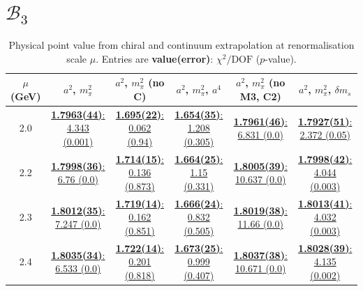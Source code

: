 \documentclass[12pt]{extarticle}
\begin{document}
\section{$\mathcal{B}_3$}
\begin{table}[h!]
\begin{center}
\begin{tabular}{|c|c|c|c|c|c|}
\hline
$\mu$ (GeV) & $a^2$, $m_\pi^2$& $a^2$, $m_\pi^2$ (no C)& $a^2$, $m_\pi^2$, $a^4$& $a^2$, $m_\pi^2$ (no M3, C2)& $a^2$, $m_\pi^2$, $\delta m_s$\\
\hline
2.0& \hyperlink{SSmPP/NPR/bag_a2m2_20.pdf.1}{\textbf{1.7963(44)}: 4.343 (0.001)} & \hyperlink{SSmPP/NPR/bag_a2m2noC_20.pdf.1}{\textbf{1.695(22)}: 0.062 (0.94)} & \hyperlink{SSmPP/NPR/bag_a2a4m2_20.pdf.1}{\textbf{1.654(35)}: 1.208 (0.305)} & \hyperlink{SSmPP/NPR/bag_a2m2mcut_20.pdf.1}{\textbf{1.7961(46)}: 6.831 (0.0)} & \hyperlink{SSmPP/NPR/bag_a2m2delm_20.pdf.1}{\textbf{1.7927(51)}: 2.372 (0.05)}\\
2.2& \hyperlink{SSmPP/NPR/bag_a2m2_22.pdf.1}{\textbf{1.7998(36)}: 6.76 (0.0)} & \hyperlink{SSmPP/NPR/bag_a2m2noC_22.pdf.1}{\textbf{1.714(15)}: 0.136 (0.873)} & \hyperlink{SSmPP/NPR/bag_a2a4m2_22.pdf.1}{\textbf{1.664(25)}: 1.15 (0.331)} & \hyperlink{SSmPP/NPR/bag_a2m2mcut_22.pdf.1}{\textbf{1.8005(39)}: 10.637 (0.0)} & \hyperlink{SSmPP/NPR/bag_a2m2delm_22.pdf.1}{\textbf{1.7998(42)}: 4.044 (0.003)}\\
2.3& \hyperlink{SSmPP/NPR/bag_a2m2_23.pdf.1}{\textbf{1.8012(35)}: 7.247 (0.0)} & \hyperlink{SSmPP/NPR/bag_a2m2noC_23.pdf.1}{\textbf{1.719(14)}: 0.162 (0.851)} & \hyperlink{SSmPP/NPR/bag_a2a4m2_23.pdf.1}{\textbf{1.666(24)}: 0.832 (0.505)} & \hyperlink{SSmPP/NPR/bag_a2m2mcut_23.pdf.1}{\textbf{1.8019(38)}: 11.66 (0.0)} & \hyperlink{SSmPP/NPR/bag_a2m2delm_23.pdf.1}{\textbf{1.8013(41)}: 4.032 (0.003)}\\
2.4& \hyperlink{SSmPP/NPR/bag_a2m2_24.pdf.1}{\textbf{1.8035(34)}: 6.533 (0.0)} & \hyperlink{SSmPP/NPR/bag_a2m2noC_24.pdf.1}{\textbf{1.722(14)}: 0.201 (0.818)} & \hyperlink{SSmPP/NPR/bag_a2a4m2_24.pdf.1}{\textbf{1.673(25)}: 0.999 (0.407)} & \hyperlink{SSmPP/NPR/bag_a2m2mcut_24.pdf.1}{\textbf{1.8037(38)}: 10.671 (0.0)} & \hyperlink{SSmPP/NPR/bag_a2m2delm_24.pdf.1}{\textbf{1.8028(39)}: 4.135 (0.002)}\\
\hline
\end{tabular}
\caption{Physical point value from chiral and continuum extrapolation at renormalisation scale $\mu$. Entries are \textbf{value(error)}: $\chi^2/\text{DOF}$ ($p$-value).}
\end{center}
\end{table}
\end{document}

